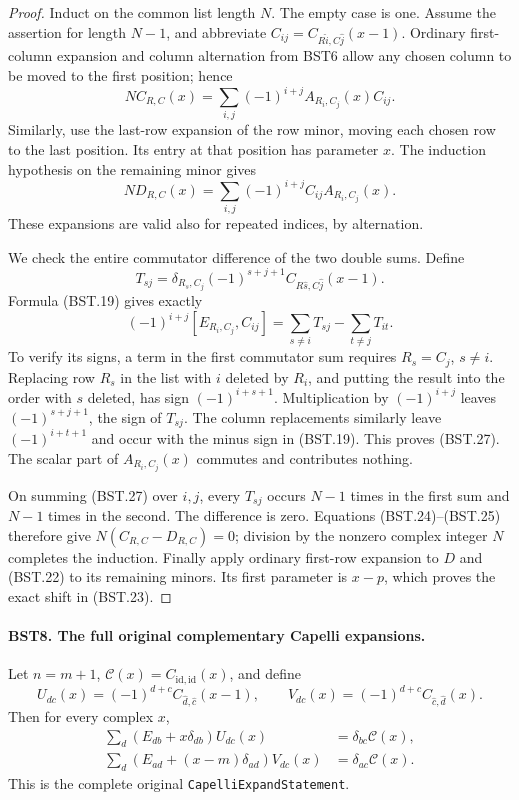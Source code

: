 \documentclass[11pt,a4paper]{article}
\numberwithin{equation}{section}
\theoremstyle{remark}\newtheorem{remark}[theorem]{Remark}
\begin{document}
\begin{proof}
Induct on the common list length $N$.  The empty case is one.
Assume the assertion for length $N-1$, and abbreviate
$C_{ij}=C_{R\widehat{i},C\widehat{j}}(x-1)$.
Ordinary first-column expansion and column alternation from BST6
allow any chosen column to be moved to the first position; hence
\[
 N C_{R,C}(x)=
       \sum_{i,j}(-1)^{i+j}A_{R_i,C_j}(x)C_{ij}.
 \tag{BST.24}
\]
Similarly, use the last-row expansion of the row minor, moving each
chosen row to the last position.  Its entry at that position has
parameter $x$.  The induction hypothesis on the remaining minor
gives
\[
 N D_{R,C}(x)=
       \sum_{i,j}(-1)^{i+j}C_{ij}A_{R_i,C_j}(x).
 \tag{BST.25}
\]
These expansions are valid also for repeated indices, by alternation.

We check the entire commutator difference of the two double sums.
Define
\[
 T_{sj}=\delta_{R_s,C_j}(-1)^{s+j+1}
                  C_{R\widehat{s},C\widehat{j}}(x-1).
 \tag{BST.26}
\]
Formula (BST.19) gives exactly
\[
 (-1)^{i+j}[E_{R_i,C_j},C_{ij}]
               =\sum_{s\ne i}T_{sj}-\sum_{t\ne j}T_{it}.
 \tag{BST.27}
\]
To verify its signs, a term in the first commutator sum requires
$R_s=C_j$, $s\ne i$.  Replacing row $R_s$ in the list with $i$
deleted by $R_i$, and putting the result into the order with $s$
deleted, has sign $(-1)^{i+s+1}$.  Multiplication by
$(-1)^{i+j}$ leaves $(-1)^{s+j+1}$, the sign of $T_{sj}$.
The column replacements similarly leave $(-1)^{i+t+1}$ and occur
with the minus sign in (BST.19).  This proves (BST.27).
The scalar part of $A_{R_i,C_j}(x)$ commutes and contributes nothing.

On summing (BST.27) over $i,j$, every $T_{sj}$ occurs $N-1$
times in the first sum and $N-1$ times in the second.  The
difference is zero.  Equations (BST.24)--(BST.25) therefore give
$N(C_{R,C}-D_{R,C})=0$; division by the nonzero complex integer
$N$ completes the induction.  Finally apply ordinary first-row
expansion to $D$ and (BST.22) to its remaining minors.  Its first
parameter is $x-p$, which proves the exact shift in (BST.23).
\end{proof}

\paragraph{BST8. The full original complementary Capelli expansions.}
\label{claim:BST8}
Let $n=m+1$, $\mathcal C(x)=C_{\mathrm{id},\mathrm{id}}(x)$,
and define
\[
 U_{dc}(x)=(-1)^{d+c}C_{\widehat d,\widehat c}(x-1),
 \qquad
 V_{dc}(x)=(-1)^{d+c}C_{\widehat c,\widehat d}(x).
 \tag{BST.28}
\]
Then for every complex $x$,
\[
 \begin{split}
 \sum_d(E_{db}+x\delta_{db})U_{dc}(x)
                         &=\delta_{bc}\mathcal C(x),\\
 \sum_d(E_{ad}+(x-m)\delta_{ad})V_{dc}(x)
                         &=\delta_{ac}\mathcal C(x).
 \end{split}
 \tag{BST.29}
\]
This is the complete original \texttt{Capelli\allowbreak Expand\allowbreak Statement}.
\end{document}
